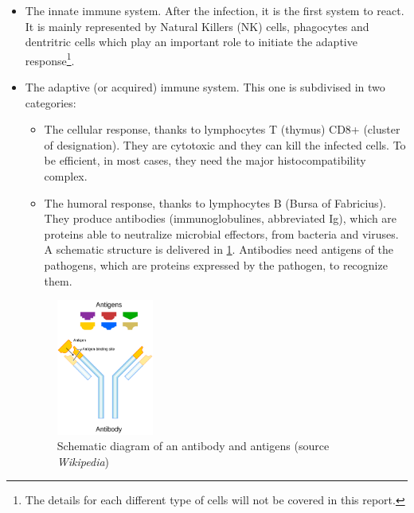 \documentclass{article}
\begin{document}
                \begin{itemize}
                    \item The innate immune system. After the infection, it is the first system to react. It is mainly represented by Natural Killers (NK) cells,
                            phagocytes and dentritric cells which play an important role to initiate the adaptive response\footnote{The details for each different type 
                                of cells will not be covered in this report.}.
                    \item The adaptive (or acquired) immune system. This one is subdivised in two categories: 
                        \begin{itemize}
                            \item The cellular response, thanks to lymphocytes T (thymus) CD8+ (cluster of designation). They are cytotoxic and they can kill the infected cells.
                                    To be efficient, in most cases, they need the major histocompatibility complex.
                            \item The humoral response, thanks to lymphocytes B (Bursa of Fabricius). They produce antibodies (immunoglobulines, abbreviated Ig),
                                    which are proteins able to 
                                    neutralize microbial effectors, from bacteria and viruses. 
                                    A schematic structure is delivered in \ref{fig:antigens}.
                                    Antibodies need antigens of the pathogens, which are proteins expressed by the pathogen, to recognize them.
                        \end{itemize}

                        \begin{figure}
                            \centering
                            \includegraphics[width=0.3\textwidth]{imgs/Antigen.png}
                        \caption{Schematic diagram of an antibody and antigens (source \emph{Wikipedia})}
                            \label{fig:antigens}
                        \end{figure}


\end{itemize}
\end{document}
